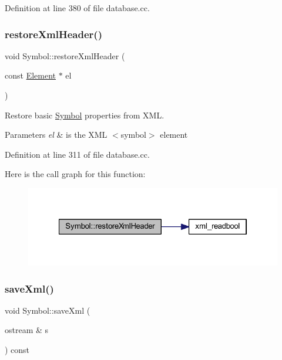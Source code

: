 Definition at line 380 of file database.\+cc.

\mbox{\label{class_symbol_aa566c1619067211810c030f5e15f69e3}} 
\subsubsection{\texorpdfstring{restoreXmlHeader()}{restoreXmlHeader()}}
{\footnotesize\ttfamily void Symbol\+::restore\+Xml\+Header (\begin{DoxyParamCaption}\item[{const \mbox{\hyperlink{class_element}{Element}} $\ast$}]{el }\end{DoxyParamCaption})}



Restore basic \mbox{\hyperlink{class_symbol}{Symbol}} properties from X\+ML. 


\begin{DoxyParams}{Parameters}
{\em el} & is the X\+ML $<$symbol$>$ element \\
\hline
\end{DoxyParams}


Definition at line 311 of file database.\+cc.

Here is the call graph for this function\+:
\nopagebreak
\begin{figure}[H]
\begin{center}
\leavevmode
\includegraphics[width=322pt]{class_symbol_aa566c1619067211810c030f5e15f69e3_cgraph}
\end{center}
\end{figure}
\mbox{\label{class_symbol_a0ef928814feb0a17fe95d006340eb499}} 
\subsubsection{\texorpdfstring{saveXml()}{saveXml()}}
{\footnotesize\ttfamily void Symbol\+::save\+Xml (\begin{DoxyParamCaption}\item[{ostream \&}]{s }\end{DoxyParamCaption}) const\hspace{0.3cm}{\ttfamily [virtual]}}



